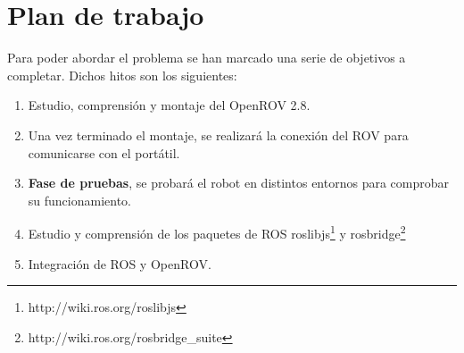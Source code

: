 \section{Plan de trabajo}
\label{sec:plandetrabajo}

Para poder abordar el problema se han marcado una serie de objetivos a completar. Dichos hitos son los siguientes:

\begin{enumerate}
\item Estudio, comprensión y montaje del OpenROV 2.8.
\item Una vez terminado el montaje, se realizará la conexión del ROV para comunicarse con el portátil.
\item \textbf{Fase de pruebas}, se probará el robot en distintos entornos para comprobar su funcionamiento.
\item Estudio y comprensión de los paquetes de ROS roslibjs\footnote{http://wiki.ros.org/roslibjs} y rosbridge\footnote{http://wiki.ros.org/rosbridge\_suite}
\item Integración de ROS y OpenROV.
\end{enumerate}